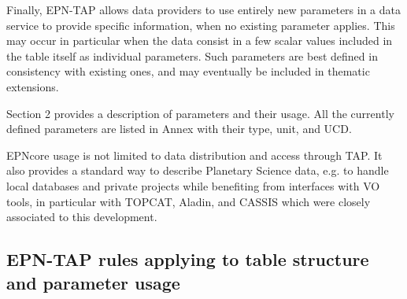 \documentclass[11pt,a4paper]{ivoa}
\begin{document}
Finally, EPN-TAP allows data providers to use entirely new parameters in a data service to provide specific information, when no existing parameter applies. This may occur in particular when the data consist in a few scalar values included in the table itself as individual parameters. Such parameters are best defined in consistency with existing ones, and may eventually be included in thematic extensions. 

Section 2 provides a description of parameters and their usage. All the currently defined parameters are listed in Annex with their type, unit, and UCD. 

EPNcore usage is not limited to data distribution and access through TAP. It also provides a standard way to describe Planetary Science data, e.g. to handle local databases and private projects while benefiting from interfaces with VO tools, in particular with TOPCAT, Aladin, and CASSIS which were closely associated to this development. 

\subsection{EPN-TAP rules applying to table structure and parameter usage}
\end{document}
